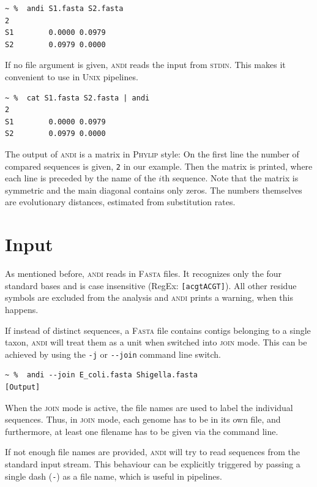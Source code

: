 \documentclass[a4paper,
  10pt,
  english,
  DIV=12,
  BCOR=8mm]{scrbook}
\newcommand{\algo}[1]{\textsc{{#1}}}
\newcommand{\andi}{\algo{andi}\xspace}
\begin{document}
\begin{lstlisting}
~ %  andi S1.fasta S2.fasta
2
S1        0.0000 0.0979
S2        0.0979 0.0000
\end{lstlisting}

If no file argument is given, \andi reads the input from \algo{stdin}. This makes it convenient to use in \algo{Unix} pipelines.

\begin{lstlisting}
~ %  cat S1.fasta S2.fasta | andi
2
S1        0.0000 0.0979
S2        0.0979 0.0000
\end{lstlisting}

The output of \andi is a matrix in \algo{Phylip} style: On the first line the number of compared sequences is given, \lstinline!2! in our example. Then the matrix is printed, where each line is preceded by the name of the $i$th sequence. Note that the matrix is symmetric and the main diagonal contains only zeros. The numbers themselves are evolutionary distances, estimated from substitution rates.


\section{Input} \label{sec:join}

As mentioned before, \andi reads in \algo{Fasta} files. It recognizes only the four standard bases and is case insensitive (RegEx: \lstinline![acgtACGT]!). All other residue symbols are excluded from the analysis and \andi prints a warning, when this happens.

If instead of distinct sequences, a \algo{Fasta} file contains contigs belonging to a single taxon, \andi will treat them as a unit when switched into \algo{join} mode. This can be achieved by using the \lstinline!-j! or \lstinline!--join! command line switch.

\begin{lstlisting}
~ %  andi --join E_coli.fasta Shigella.fasta
[Output]
\end{lstlisting}

When the \algo{join} mode is active, the file names are used to label the individual sequences. Thus, in \algo{join} mode, each genome has to be in its own file, and furthermore, at least one filename has to be given via the command line.

If not enough file names are provided, \andi will try to read sequences from the standard input stream. This behaviour can be explicitly triggered by passing a single dash (\lstinline$-$) as a file name, which is useful in pipelines.
\end{document}
